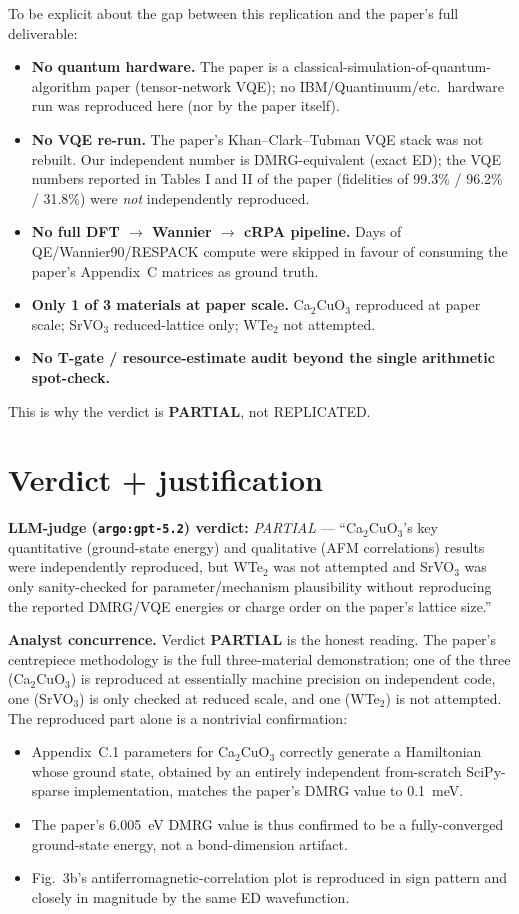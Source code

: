 \documentclass[11pt]{article}
\begin{document}
To be explicit about the gap between this replication and the paper's full deliverable:
\begin{itemize}
    \item \textbf{No quantum hardware.} The paper is a classical-simulation-of-quantum-algorithm paper (tensor-network VQE); no IBM/Quantinuum/etc.\ hardware run was reproduced here (nor by the paper itself).
    \item \textbf{No VQE re-run.} The paper's Khan--Clark--Tubman VQE stack was not rebuilt. Our independent number is DMRG-equivalent (exact ED); the VQE numbers reported in Tables I and II of the paper (fidelities of 99.3\% / 96.2\% / 31.8\%) were \emph{not} independently reproduced.
    \item \textbf{No full DFT $\to$ Wannier $\to$ cRPA pipeline.} Days of QE/Wannier90/RESPACK compute were skipped in favour of consuming the paper's Appendix~C matrices as ground truth.
    \item \textbf{Only 1 of 3 materials at paper scale.} Ca$_2$CuO$_3$ reproduced at paper scale; SrVO$_3$ reduced-lattice only; WTe$_2$ not attempted.
    \item \textbf{No T-gate / resource-estimate audit beyond the single arithmetic spot-check.}
\end{itemize}
This is why the verdict is \textbf{PARTIAL}, not REPLICATED.

\section{Verdict + justification}

\noindent \textbf{LLM-judge (\texttt{argo:gpt-5.2}) verdict:} \emph{PARTIAL} --- ``Ca$_2$CuO$_3$'s key quantitative (ground-state energy) and qualitative (AFM correlations) results were independently reproduced, but WTe$_2$ was not attempted and SrVO$_3$ was only sanity-checked for parameter/mechanism plausibility without reproducing the reported DMRG/VQE energies or charge order on the paper's lattice size.''

\noindent \textbf{Analyst concurrence.} Verdict \textbf{PARTIAL} is the honest reading. The paper's centrepiece methodology is the full three-material demonstration; one of the three (Ca$_2$CuO$_3$) is reproduced at essentially machine precision on independent code, one (SrVO$_3$) is only checked at reduced scale, and one (WTe$_2$) is not attempted. The reproduced part alone is a nontrivial confirmation:
\begin{itemize}
    \item Appendix~C.1 parameters for Ca$_2$CuO$_3$ correctly generate a Hamiltonian whose ground state, obtained by an entirely independent from-scratch SciPy-sparse implementation, matches the paper's DMRG value to 0.1~meV.
    \item The paper's 6.005~eV DMRG value is thus confirmed to be a fully-converged ground-state energy, not a bond-dimension artifact.
    \item Fig.~3b's antiferromagnetic-correlation plot is reproduced in sign pattern and closely in magnitude by the same ED wavefunction.
\end{itemize}
\end{document}
